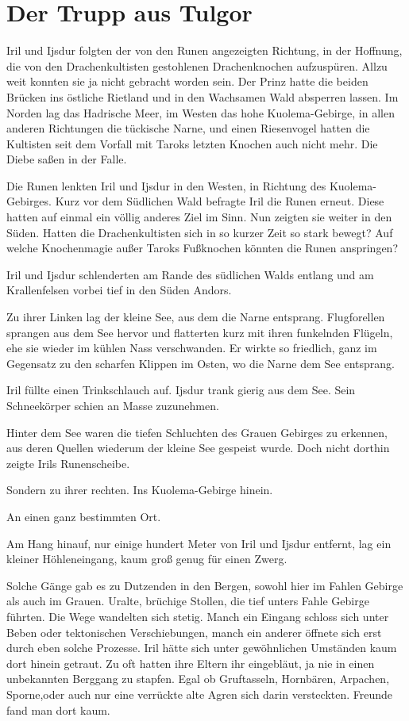 \newpage
\section{Der Trupp aus Tulgor}




Iril und Ijsdur folgten der von den Runen angezeigten Richtung, in der Hoffnung, die von den Drachenkultisten gestohlenen Drachenknochen aufzuspüren. Allzu weit konnten sie ja nicht gebracht worden sein. Der Prinz hatte die beiden Brücken ins östliche Rietland und in den Wachsamen Wald absperren lassen. Im Norden lag das Hadrische Meer, im Westen das hohe Kuolema-Gebirge, in allen anderen Richtungen die tückische Narne, und einen Riesenvogel hatten die Kultisten seit dem Vorfall mit Taroks letzten Knochen auch nicht mehr. Die Diebe saßen in der Falle.

Die Runen lenkten Iril und Ijsdur in den Westen, in Richtung des Kuolema-Gebirges. Kurz vor dem Südlichen Wald befragte Iril die Runen erneut. Diese hatten auf einmal ein völlig anderes Ziel im Sinn. Nun zeigten sie weiter in den Süden. Hatten die Drachenkultisten sich in so kurzer Zeit so stark bewegt? Auf welche Knochenmagie außer Taroks Fußknochen könnten die Runen anspringen?

Iril und Ijsdur schlenderten am Rande des südlichen Walds entlang und am Krallenfelsen vorbei tief in den Süden Andors.

Zu ihrer Linken lag der kleine See, aus dem die Narne entsprang. Flugforellen sprangen aus dem See hervor und flatterten kurz mit ihren funkelnden Flügeln, ehe sie wieder im kühlen Nass verschwanden. Er wirkte so friedlich, ganz im Gegensatz zu den scharfen Klippen im Osten, wo die Narne dem See entsprang.

Iril füllte einen Trinkschlauch auf. Ijsdur trank gierig aus dem See. Sein Schneekörper schien an Masse zuzunehmen.

Hinter dem See waren die tiefen Schluchten des Grauen Gebirges zu erkennen, aus deren Quellen wiederum der kleine See gespeist wurde. Doch nicht dorthin zeigte Irils Runenscheibe.

Sondern zu ihrer rechten. Ins Kuolema-Gebirge hinein.

An einen ganz bestimmten Ort.

Am Hang hinauf, nur einige hundert Meter von Iril und Ijsdur entfernt, lag ein kleiner Höhleneingang, kaum groß genug für einen Zwerg.

Solche Gänge gab es zu Dutzenden in den Bergen, sowohl hier im Fahlen Gebirge als auch im Grauen. Uralte, brüchige Stollen, die tief unters Fahle Gebirge führten. Die Wege wandelten sich stetig. Manch ein Eingang schloss sich unter Beben oder tektonischen Verschiebungen, manch ein anderer öffnete sich erst durch eben solche Prozesse. Iril hätte sich unter gewöhnlichen Umständen kaum dort hinein getraut. Zu oft hatten ihre Eltern ihr eingebläut, ja nie in einen unbekannten Berggang zu stapfen. Egal ob Gruftasseln, Hornbären, Arpachen, Sporne,oder auch nur eine verrückte alte Agren sich darin versteckten. Freunde fand man dort kaum.

